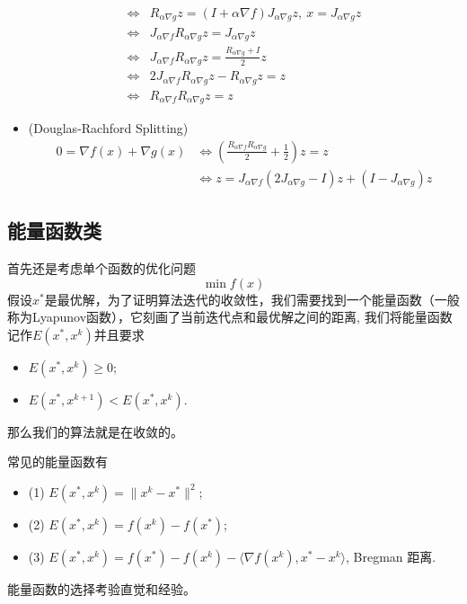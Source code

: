 \begin{itemize}
\begin{equation}
\begin{aligned}
            \Longleftrightarrow& R_{\alpha \nabla g}z = (I+\alpha \nabla f)J_{\alpha \nabla g}z , \ x=J_{\alpha \nabla g}z\\
            \Longleftrightarrow& J_{\alpha\nabla f}R_{\alpha \nabla g}z = J_{\alpha \nabla g}z\\
            \Longleftrightarrow& J_{\alpha\nabla f}R_{\alpha \nabla g}z = \frac{R_{\alpha \nabla g}+I}{2}z\\
            \Longleftrightarrow& 2J_{\alpha\nabla f}R_{\alpha \nabla g}z-R_{\alpha \nabla g}z= z\\
            \Longleftrightarrow& R_{\alpha\nabla f}R_{\alpha \nabla g}z= z
        \end{aligned}
    \end{equation}
    \item (Douglas-Rachford Splitting) 
    \begin{equation}
        \begin{aligned}
            0=\nabla f(x) + \nabla g(x)&\Longleftrightarrow(\frac{R_{\alpha\nabla f}R_{\alpha \nabla g}}{2}+\frac{1}{2})z= z\\
           &  \Longleftrightarrow z = J_{\alpha \nabla f}(2J_{\alpha\nabla g}-I)z +(I-J_{\alpha\nabla g})z
        \end{aligned}
    \end{equation}
\end{itemize}
\subsection{能量函数类}
首先还是考虑单个函数的优化问题
\begin{equation}\label{eq:opt_problem}
\min f(x)
\end{equation}
假设\(x^*\)是最优解，为了证明算法迭代的收敛性，我们需要找到一个能量函数（一般称为Lyapunov函数），它刻画了当前迭代点和最优解之间的距离, 我们将能量函数记作$E(x^*,x^k)$并且要求
\begin{itemize}
    \item $E(x^*,x^k) \geq 0$;
    \item $E(x^*,x^{k+1}) < E(x^*,x^k)$.
\end{itemize}
那么我们的算法就是在收敛的。

常见的能量函数有
\begin{itemize}
    \item (1) $E(x^*,x^k) = \|x^k - x^*\|^2$;
    \item (2) $E(x^*,x^k) = f(x^k) - f(x^*)$;
    \item (3) $E(x^*,x^k) = f(x^*) - f(x^k) -\langle\nabla f(x^k),x^*-x^k \rangle $, Bregman 距离.
\end{itemize}
\begin{remark}
    能量函数的选择考验直觉和经验。
\end{remark}
\newpage
